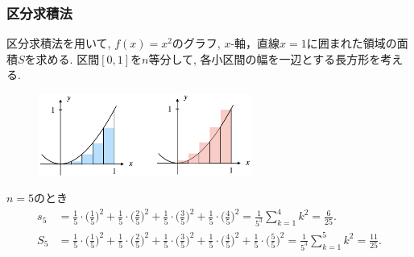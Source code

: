 \begin{frame}
\frametitle{区分求積法}

区分求積法を用いて, $f(x)=x^2$のグラフ, $x$-軸，直線$x=1$に囲まれた領域の面積$S$を求める. 
区間$[0,1]$を$n$等分して, 各小区間の幅を一辺とする長方形を考える. 
\vspace{-2mm}

\begin{figure}[htbp]
 \begin{center} 
  \includegraphics[width=70mm]{calculus12/RiemannSum.png}
 \end{center}
\end{figure}

\vspace{-3mm}

$n=5$のとき
{\small 
\begin{align*}
s_5 &= \frac{1}{5} \cdot \big(\frac{1}{5}\big)^2+\frac{1}{5} \cdot \big(\frac{2}{5}\big)^2+\frac{1}{5} \cdot \big(\frac{3}{5}\big)^2 + \frac{1}{5} \cdot \big(\frac{4}{5}\big)^2
= \frac{1}{5^3}\sum_{k=1}^4 k^2=\frac{6}{25}. \\
S_5 &= \frac{1}{5} \cdot \big(\frac{1}{5}\big)^2+\frac{1}{5} \cdot \big(\frac{2}{5}\big)^2+\frac{1}{5} \cdot \big(\frac{3}{5}\big)^2 
+ \frac{1}{5} \cdot \big(\frac{4}{5}\big)^2 + \frac{1}{5} \cdot \big(\frac{5}{5}\big)^2
= \frac{1}{5^3}\sum_{k=1}^5 k^2=\frac{11}{25}. 
\end{align*}
}

\end{frame}




